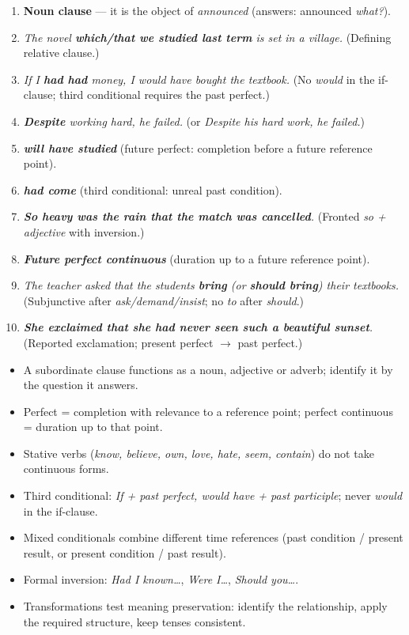 \documentclass[11pt]{article}
\begin{document}
\begin{corrige}[Exercise n° 1]
\begin{enumerate}
\item \textbf{Noun clause} — it is the object of \emph{announced} (answers: announced \emph{what?}).
\item \emph{The novel \textbf{which/that we studied last term} is set in a village.} (Defining relative clause.)
\item \emph{If I \textbf{had had} money, I would have bought the textbook.} (No \emph{would} in the if-clause; third conditional requires the past perfect.)
\item \emph{\textbf{Despite} working hard, he failed.} (or \emph{Despite his hard work, he failed.})
\item \emph{\textbf{will have studied}} (future perfect: completion before a future reference point).
\item \emph{\textbf{had come}} (third conditional: unreal past condition).
\item \emph{\textbf{So heavy was the rain that the match was cancelled}.} (Fronted \emph{so + adjective} with inversion.)
\item \emph{\textbf{Future perfect continuous}} (duration up to a future reference point).
\item \emph{The teacher asked that the students \textbf{bring} (or \textbf{should bring}) their textbooks.} (Subjunctive after \emph{ask/demand/insist}; no \emph{to} after \emph{should}.)
\item \emph{\textbf{She exclaimed that she had never seen such a beautiful sunset}.} (Reported exclamation; present perfect $\rightarrow$ past perfect.)
\end{enumerate}
\end{corrige}

\begin{aretenir}
\begin{itemize}
\item A subordinate clause functions as a noun, adjective or adverb; identify it by the question it answers.
\item Perfect = completion with relevance to a reference point; perfect continuous = duration up to that point.
\item Stative verbs (\emph{know, believe, own, love, hate, seem, contain}) do not take continuous forms.
\item Third conditional: \emph{If + past perfect, would have + past participle}; never \emph{would} in the if-clause.
\item Mixed conditionals combine different time references (past condition / present result, or present condition / past result).
\item Formal inversion: \emph{Had I known\ldots}, \emph{Were I\ldots}, \emph{Should you\ldots}.
\item Transformations test meaning preservation: identify the relationship, apply the required structure, keep tenses consistent.
\end{itemize}
\end{aretenir}
\end{document}
